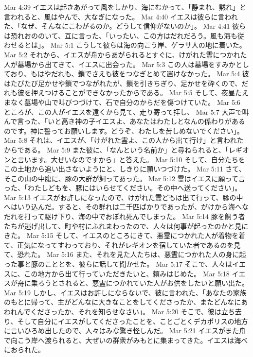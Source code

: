 Mar 4:39  イエスは起きあがって風をしかり、海にむかって、「静まれ、黙れ」と言われると、風はやんで、大なぎになった。
Mar 4:40  イエスは彼らに言われた、「なぜ、そんなにこわがるのか。どうして信仰がないのか」。
Mar 4:41  彼らは恐れおののいて、互に言った、「いったい、この方はだれだろう。風も海も従わせるとは」。
Mar 5:1  こうして彼らは海の向こう岸、ゲラサ人の地に着いた。
Mar 5:2  それから、イエスが舟からあがられるとすぐに、けがれた霊につかれた人が墓場から出てきて、イエスに出会った。
Mar 5:3  この人は墓場をすみかとしており、もはやだれも、鎖でさえも彼をつなぎとめて置けなかった。
Mar 5:4  彼はたびたび足かせや鎖でつながれたが、鎖を引きちぎり、足かせを砕くので、だれも彼を押えつけることができなかったからである。
Mar 5:5  そして、夜昼たえまなく墓場や山で叫びつづけて、石で自分のからだを傷つけていた。
Mar 5:6  ところが、この人がイエスを遠くから見て、走り寄って拝し、
Mar 5:7  大声で叫んで言った、「いと高き神の子イエスよ、あなたはわたしとなんの係わりがあるのです。神に誓ってお願いします。どうぞ、わたしを苦しめないでください」。
Mar 5:8  それは、イエスが、「けがれた霊よ、この人から出て行け」と言われたからである。
Mar 5:9  また彼に、「なんという名前か」と尋ねられると、「レギオンと言います。大ぜいなのですから」と答えた。
Mar 5:10  そして、自分たちをこの土地から追い出さないようにと、しきりに願いつづけた。
Mar 5:11  さて、そこの山の中腹に、豚の大群が飼ってあった。
Mar 5:12  霊はイエスに願って言った、「わたしどもを、豚にはいらせてください。その中へ送ってください」。
Mar 5:13  イエスがお許しになったので、けがれた霊どもは出て行って、豚の中へはいり込んだ。すると、その群れは二千匹ばかりであったが、がけから海へなだれを打って駆け下り、海の中でおぼれ死んでしまった。
Mar 5:14  豚を飼う者たちが逃げ出して、町や村にふれまわったので、人々は何事が起ったのかと見にきた。
Mar 5:15  そして、イエスのところにきて、悪霊につかれた人が着物を着て、正気になってすわっており、それがレギオンを宿していた者であるのを見て、恐れた。
Mar 5:16  また、それを見た人たちは、悪霊につかれた人の身に起った事と豚のこととを、彼らに話して聞かせた。
Mar 5:17  そこで、人々はイエスに、この地方から出て行っていただきたいと、頼みはじめた。
Mar 5:18  イエスが舟に乗ろうとされると、悪霊につかれていた人がお供をしたいと願い出た。
Mar 5:19  しかし、イエスはお許しにならないで、彼に言われた、「あなたの家族のもとに帰って、主がどんなに大きなことをしてくださったか、またどんなにあわれんでくださったか、それを知らせなさい」。
Mar 5:20  そこで、彼は立ち去り、そして自分にイエスがしてくださったことを、ことごとくデカポリスの地方に言いひろめ出したので、人々はみな驚き怪しんだ。
Mar 5:21  イエスがまた舟で向こう岸へ渡られると、大ぜいの群衆がみもとに集まってきた。イエスは海べにおられた。
